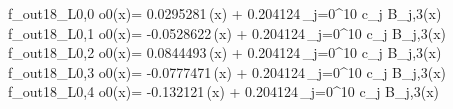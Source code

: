 f_{out18_L0,0	o0}(x)= 0.0295281\,\phi(x) + 0.204124\,\sum_{j=0}^{10} c_j B_{j,3}(x)
f_{out18_L0,1	o0}(x)= -0.0528622\,\phi(x) + 0.204124\,\sum_{j=0}^{10} c_j B_{j,3}(x)
f_{out18_L0,2	o0}(x)= 0.0844493\,\phi(x) + 0.204124\,\sum_{j=0}^{10} c_j B_{j,3}(x)
f_{out18_L0,3	o0}(x)= -0.0777471\,\phi(x) + 0.204124\,\sum_{j=0}^{10} c_j B_{j,3}(x)
f_{out18_L0,4	o0}(x)= -0.132121\,\phi(x) + 0.204124\,\sum_{j=0}^{10} c_j B_{j,3}(x)
